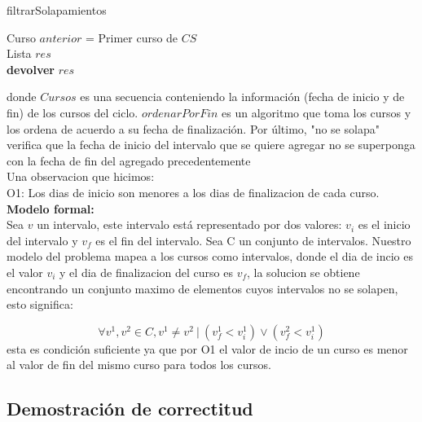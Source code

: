 \begin{algorithm}[H]
	\SetAlgoLined
	\caption{filtrarSolapamientos}
	Curso $anterior$ = Primer curso de $CS$\\
	Lista $res$\\
	\textbf{devolver} $res$\\	
\end{algorithm}

donde $Cursos$ es una secuencia conteniendo la información (fecha de inicio y de fin) de los cursos del ciclo. $ordenarPorFin$ es un algoritmo que toma los cursos y los ordena de acuerdo a su fecha de finalización. Por último, "no se solapa" verifica que la fecha de inicio del intervalo que se quiere agregar no se superponga con la fecha de fin del agregado precedentemente\\
Una observacion que hicimos:\\
O1: Los dias de inicio son menores a los dias de finalizacion de cada curso.\\

\textbf{Modelo formal:}\\
Sea $v$ un intervalo, este intervalo está representado por dos valores: $v_{i}$ es el inicio del intervalo y $v_{f}$ es el fin del intervalo. Sea C un conjunto de intervalos. Nuestro modelo del problema mapea a los cursos como intervalos, donde el dia de incio es el valor $v_{i}$ y el dia de finalizacion del curso es $v_{f}$, la solucion se obtiene encontrando un conjunto maximo de elementos cuyos intervalos no se solapen, esto significa: 
\par{$$\forall v^{1}, v^{2} \in C, v^{1} \neq v^{2}\ | \ (v^{1}_{f} < v^{1}_{i}) \vee (v^{2}_{f} < v^{1}_{i})$$} 
esta es condición suficiente ya que por O1 el valor de incio de un curso es menor al valor de fin del mismo curso para todos los cursos.

\subsection{Demostración de correctitud}

